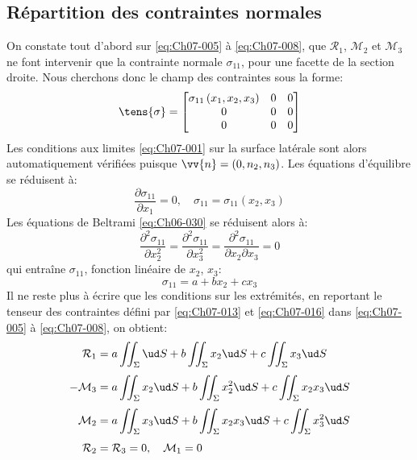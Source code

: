 \subsection{Répartition des contraintes normales} \label{ssec:Ch07-1.2}
On constate tout d'abord sur \eqref{eq:Ch07-005} à \eqref{eq:Ch07-008}, que $\mathcal{R}_1$, $\mathcal{M}_2$ et $\mathcal{M}_3$ ne font intervenir que la contrainte normale $\sigma_{11}$, pour une facette de la section droite.
Nous cherchons donc le champ des contraintes sous la forme:
\begin{equation}
    \tens{\sigma} = 
    \begin{bmatrix}
        \sigma_{11}\left( x_1, x_2, x_3 \right) & 0 & 0 \\
        0 & 0 & 0 \\
        0 & 0 & 0
    \end{bmatrix}
    \label{eq:Ch07-013}
\end{equation}
Les conditions aux limites \eqref{eq:Ch07-001} sur la surface latérale sont alors automatiquement vérifiées puisque $\vv{n}=\left( 0,n_2,n_3 \right)$.
Les équations d'équilibre se réduisent à:
\begin{equation}
    \frac{\partial \sigma_{11}}{\partial x_1} = 0,\quad \sigma_{11} = \sigma_{11}\left( x_2,x_3 \right)
    \label{eq:Ch07-014}
\end{equation}
Les équations de Beltrami \eqref{eq:Ch06-030} se réduisent alors à:
\begin{equation}
    \frac{\partial^2 \sigma_{11}}{\partial x_2^2} = \frac{\partial^2 \sigma_{11}}{\partial x_3^2} = \frac{\partial^2 \sigma_{11}}{\partial x_2 \partial x_3} = 0
    \label{eq:Ch07-015}
\end{equation}
qui entraîne $\sigma_{11}$, fonction linéaire de $x_2$, $x_3$:
\begin{equation}
    \sigma_{11} = a + b x_2 + c x_3
    \label{eq:Ch07-016}
\end{equation}
Il ne reste plus à écrire que les conditions sur les extrémités, en reportant le tenseur des contraintes défini par \eqref{eq:Ch07-013} et \eqref{eq:Ch07-016} dans \eqref{eq:Ch07-005} à \eqref{eq:Ch07-008}, on obtient:
\begin{equation}
    \begin{aligned}
        \mathcal{R}_1 &= a \iint_{\Sigma} \ud S + b \iint_{\Sigma} x_2 \ud S + c \iint_{\Sigma} x_3 \ud S \\[3pt]
        -\mathcal{M}_3 &= a \iint_{\Sigma} x_2\ud S + b \iint_{\Sigma} x_2^2 \ud S + c \iint_{\Sigma} x_2 x_3 \ud S \\[3pt]
        \mathcal{M}_2 &= a \iint_{\Sigma} x_3 \ud S + b \iint_{\Sigma} x_2 x_3 \ud S + c \iint_{\Sigma} x_3^2 \ud S \\[3pt]
        \mathcal{R}_2 &= \mathcal{R}_3 = 0, \quad \mathcal{M}_1 = 0
    \end{aligned}
    \label{eq:Ch07-017}
\end{equation}
